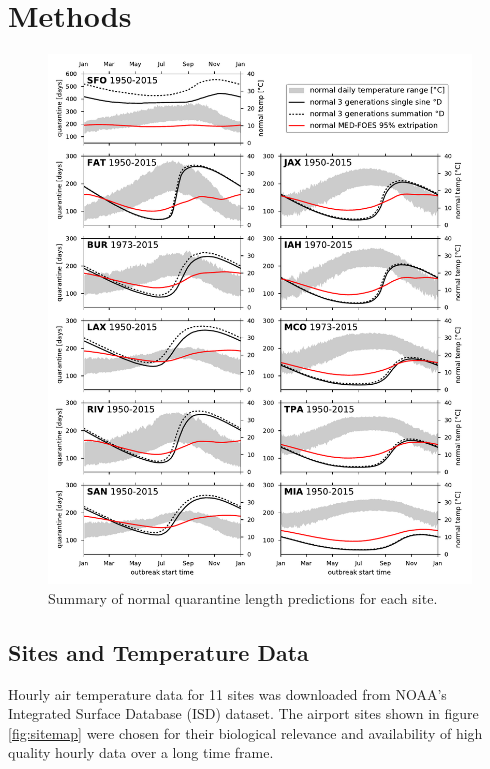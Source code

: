 \documentclass[10pt,a4paper,twocolumn]{article}
\begin{document}
\section*{Methods}


\begin{figure}[ht!] %
\centering
\includegraphics[width=1\textwidth]{figs/fig_main.pdf}
\caption{\label{fig:main_summary}Summary of normal quarantine length predictions for each site.}
\end{figure}



\subsection*{Sites and Temperature Data}
Hourly air temperature data for 11 sites was downloaded from 
NOAA's Integrated Surface Database (ISD) dataset\cite{smith_integrated_2011,NOAA_ISD_portal}.
The airport sites shown in figure \ref{fig:sitemap} 
were chosen for their biological relevance and 
availability of high quality hourly data over a long time frame.
\end{document}

